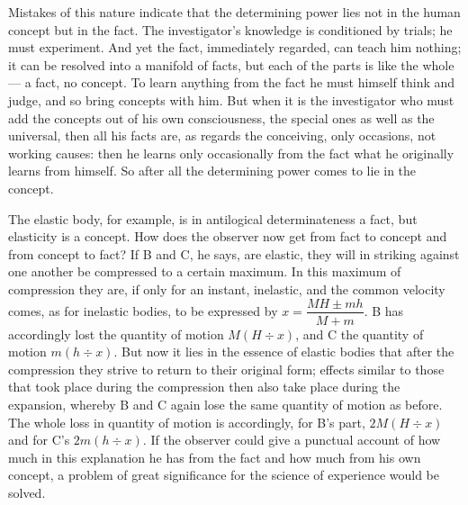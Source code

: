 \documentclass[12pt,a4paper]{book}
\begin{document}
Mistakes of this nature indicate that the determining power lies not in the human concept but in
the fact. The investigator's knowledge is conditioned by trials; he must experiment. And yet the
fact, immediately regarded, can teach him nothing; it can be resolved into a manifold of facts,
but each of the parts is like the whole --- a fact, no concept. To learn anything from the fact
he must himself think and judge, and so bring concepts with him. But when it is
the investigator who must add the concepts out of his own consciousness, the special ones as
well as the universal, then all his facts are, as regards the conceiving, only occasions, not
working causes: then he learns only occasionally from the fact what he originally learns from
himself. So after all the determining power comes to lie in the concept.

The elastic body, for example, is in antilogical determinateness a fact, but elasticity is a
concept. How does the observer now get from fact to concept and from concept to fact? If B and
C, he says, are elastic, they will in striking against one another be compressed to a certain
maximum. In this maximum of compression they are, if only for an instant, inelastic, and the
common velocity comes, as for inelastic bodies, to be expressed by
$x = \dfrac{MH \pm mh}{M + m}$. B has accordingly lost the quantity of motion $M(H \div x)$, and
C the quantity of motion $m (h \div x)$. But now it lies in the essence of elastic bodies that
after the compression they strive to return to their original form; effects similar to those
that took place during the compression then also take place during the expansion, whereby B and
C again lose the same quantity of motion as before. The whole loss in quantity of motion is
accordingly, for B's part, $2 M (H \div x)$ and for C's $2 m (h \div x)$. If the observer could
give a punctual account of how much in this explanation he has from the fact and how much from
his own concept, a problem of great significance for the science of experience would be solved.
\end{document}
